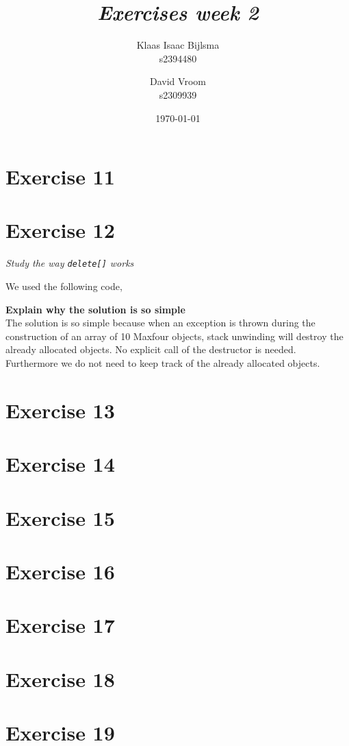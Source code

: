\documentclass[12pt]{article}
\title{\itshape Exercises week 2}
\author{
	Klaas Isaac Bijlsma \\ s2394480
	\and
	David Vroom \\ s2309939
}
\date{\today}
\newcommand{\desc}[1]{\textit{#1} \vspace{1em}}
\begin{document}
\maketitle

\section*{Exercise 11}
\desc{}


\clearpage
\section*{Exercise 12}
\desc{Study the way \texttt{delete[]} works}

We used the following code,










\textbf{Explain why the solution is so simple}\\
The solution is so simple because when an exception is thrown during the construction of an array of 10 Maxfour objects, stack unwinding will destroy the already allocated objects. No explicit call of the destructor is needed. Furthermore we do not need to keep track of the already allocated objects. 

\clearpage
\section*{Exercise 13}
\desc{}

\clearpage
\section*{Exercise 14}
\desc{}


\clearpage
\section*{Exercise 15}
\desc{}

\clearpage
\section*{Exercise 16}
\desc{}


\clearpage
\section*{Exercise 17}
\desc{}


\clearpage
\section*{Exercise 18}
\desc{}


\clearpage
\section*{Exercise 19}
\desc{}


\clearpage
\end{document}
